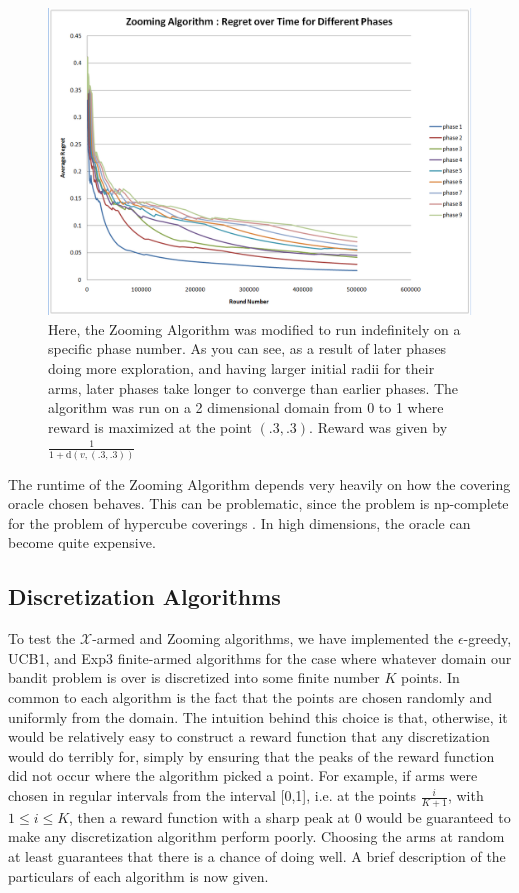 \begin{figure}[!ht]
  \begin{center}
    \includegraphics[width=5 in]{figures/Phase_Comparison.png}
     \caption{Here, the Zooming Algorithm was modified to run indefinitely on a specific phase number. As you can see, as a result of later phases doing more exploration, and having larger initial radii for their arms, later phases take longer to converge than earlier phases. The algorithm was run on a 2 dimensional domain from 0 to 1 where reward is maximized at the point $(.3,.3)$. Reward was given by $\frac{1}{1+\mathrm{d}(v,(.3,.3))}$}
     \label{fig:zoomphase}
  \end{center}
\end{figure}



The runtime of the Zooming Algorithm depends very heavily on how the
covering oracle chosen behaves. This can be problematic, since the problem
is np-complete for the problem of hypercube coverings  \cite{Hoffmann05acovering} . In high dimensions,
the oracle can become quite expensive.

\subsection{Discretization Algorithms}
To test the $\mathcal{X}$-armed and Zooming algorithms, we have implemented
the $\epsilon$-greedy, UCB1, and Exp3 finite-armed algorithms for
the case where whatever domain our bandit problem is over is discretized
into some finite number $K$ points.  In common to each algorithm is the
fact that the points are chosen randomly and uniformly from the domain.  The
intuition behind this choice is that, otherwise, it would be relatively easy
to construct a reward function that any discretization would do terribly
for, simply by ensuring that the peaks of the reward function did not occur
where the algorithm picked a point.  For example, if arms were chosen in
regular intervals from the interval [0,1], i.e. at the points 
$\frac{i}{K+1}$, with $1 \leq i \leq K$, then a reward function with a
sharp peak at 0 would be guaranteed to make any discretization algorithm
perform poorly.  Choosing the arms at random at least guarantees that there
is a chance of doing well.  A brief description of the particulars of 
each algorithm is now given.

